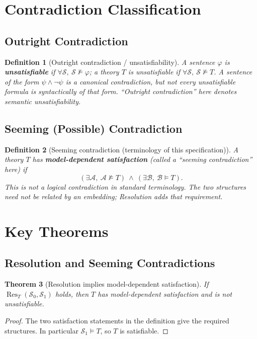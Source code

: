 \documentclass[11pt]{article}
\newtheorem{definition}{Definition}
\newtheorem{theorem}[definition]{Theorem}
\newcommand{\Sat}{\models}
\newcommand{\NSat}{\not\models}
\newcommand{\Res}{\operatorname{Res}}
\begin{document}
\section{Contradiction Classification}
\subsection{Outright Contradiction}
\begin{definition}[Outright contradiction / unsatisfiability]
A sentence $\varphi$ is \textbf{unsatisfiable} if $\forall\mathcal S,\ \mathcal S\NSat\varphi$; a theory $T$ is unsatisfiable if $\forall\mathcal S,\ \mathcal S\NSat T$. A sentence of the form $\psi\land\neg\psi$ is a canonical contradiction, but not every unsatisfiable formula is syntactically of that form. ``Outright contradiction'' here denotes semantic unsatisfiability.
\end{definition}
\subsection{Seeming (Possible) Contradiction}
\begin{definition}[Seeming contradiction (terminology of this specification)]
A theory $T$ has \textbf{model-dependent satisfaction} (called a ``seeming contradiction'' here) if
\[
(\exists\mathcal A,\ \mathcal A\NSat T)\ \land\
(\exists\mathcal B,\ \mathcal B\Sat T).
\]
This is not a logical contradiction in standard terminology. The two structures need not be related by an embedding; Resolution adds that requirement.
\end{definition}

\section{Key Theorems}
\subsection{Resolution and Seeming Contradictions}
\begin{theorem}[Resolution implies model-dependent satisfaction]
If $\Res_T(\mathcal S_0,\mathcal S_1)$ holds, then $T$ has model-dependent satisfaction and is not unsatisfiable.
\end{theorem}
\begin{proof}
The two satisfaction statements in the definition give the required structures. In particular $\mathcal S_1\Sat T$, so $T$ is satisfiable.
\end{proof}
\end{document}
